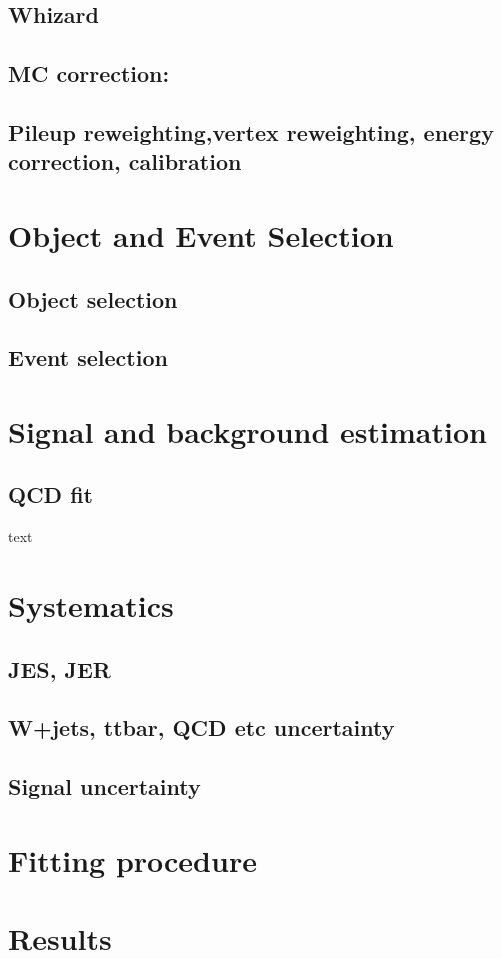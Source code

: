 \documentclass[12pt]{article}
\begin{document}
\subsection{Whizard}
\subsection{MC correction:}
\subsection{Pileup reweighting,vertex reweighting, energy correction, calibration}
\section{Object and Event Selection}

\subsection{Object selection}



\subsection{Event selection}
\section{Signal and background estimation}
\subsection{QCD fit}
text


\section{Systematics}
\subsection{JES, JER}
\subsection{W+jets, ttbar, QCD etc uncertainty}
\subsection{Signal uncertainty}
\section{Fitting procedure}
\section{Results}
\end{document}
